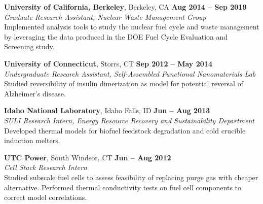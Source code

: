 \documentclass[margin,line]{resume}
\begin{document}
\begin{resume}
\textbf{University of California, Berkeley}, Berkeley, CA \hfill 
    \textbf{Aug 2014 -- Sep 2019 } \\
\textsl{Graduate Research Assistant, Nuclear Waste Management Group} \\
Implemented analysis tools to study the nuclear fuel cycle and waste management by leveraging the data produced in the DOE Fuel Cycle Evaluation and Screening study.

\textbf{University of Connecticut}, Storrs, CT \hfill 
    \textbf{Sep 2012 -- May 2014} \\
\textsl{Undergraduate Research Assistant, Self-Assembled Functional Nanomaterials Lab} \\
Studied reversibility of insulin dimerization as model for potential reversal of Alzheimer's disease.

\textbf{Idaho National Laboratory}, Idaho Falls, ID \hfill 
    \textbf{Jun -- Aug 2013} \\
\textsl{SULI Research Intern, Energy Resource Recovery and Sustainability Department} \\
Developed thermal models for biofuel feedstock degradation and cold crucible induction melters.

\textbf{UTC Power}, South Windsor, CT \hfill 
    \textbf{Jun -- Aug 2012} \\
\textsl{Cell Stack Research Intern} \\
Studied subscale fuel cells to assess feasibility of replacing purge gas with cheaper alternative. Performed thermal conductivity tests on fuel cell components to correct model correlations.\\


\end{resume}
\end{document}
